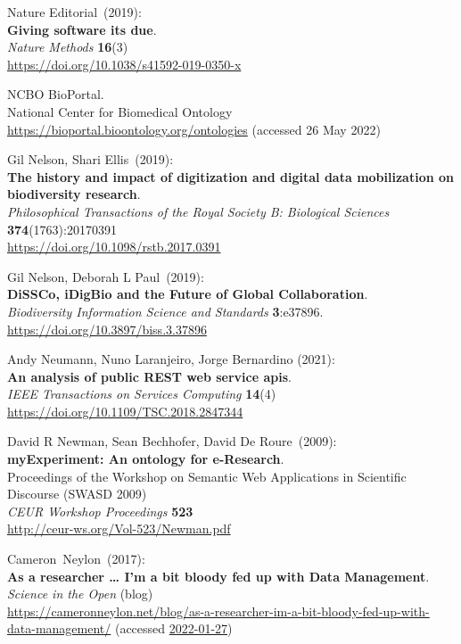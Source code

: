\begin{thebibliography}{9}
Nature Editorial~(2019):\\
\textbf{Giving software its due}.\\
\emph{Nature Methods} \textbf{16}(3)\\
\url{https://doi.org/10.1038/s41592-019-0350-x}

NCBO BioPortal.\\
National Center for Biomedical Ontology \\
\url{https://bioportal.bioontology.org/ontologies} (accessed 26 May
2022)

Gil Nelson, Shari Ellis~(2019):\\
\textbf{The history and impact of digitization and digital data mobilization on
biodiversity research}.\\
\emph{Philosophical Transactions of the Royal Society B: Biological Sciences}
\textbf{374}(1763):20170391\\
\url{https://doi.org/10.1098/rstb.2017.0391}

Gil Nelson, Deborah L Paul~(2019):\\
\textbf{DiSSCo, iDigBio and the Future of Global Collaboration}.\\
\emph{Biodiversity Information Science and Standards}
\textbf{3}:e37896.\\
\url{https://doi.org/10.3897/biss.3.37896}

Andy Neumann, Nuno Laranjeiro, Jorge Bernardino (2021): \\
\textbf{An analysis of public {REST} web service apis}.\\
\emph{IEEE Transactions on Services Computing} \textbf{14}(4)\\
\url{https://doi.org/10.1109/TSC.2018.2847344}

David R Newman, Sean Bechhofer, David De Roure~(2009):\\
\textbf{myExperiment: An ontology for e-Research}.\\
Proceedings of the Workshop on Semantic Web Applications in
Scientific Discourse (SWASD 2009)\\
\emph{CEUR Workshop Proceedings} \textbf{523}\\
\url{http://ceur-ws.org/Vol-523/Newman.pdf}

Cameron~Neylon~(2017):\\
\textbf{As a researcher \ldots{} I'm a bit bloody fed up with Data
Management}.\\
\emph{Science in the Open} (blog)\\
\url{https://cameronneylon.net/blog/as-a-researcher-im-a-bit-bloody-fed-up-with-data-management/}
(accessed \href{https://web.archive.org/web/20220127113116/https://cameronneylon.net/blog/as-a-researcher-im-a-bit-bloody-fed-up-with-data-management/}{2022-01-27})


\end{thebibliography}
